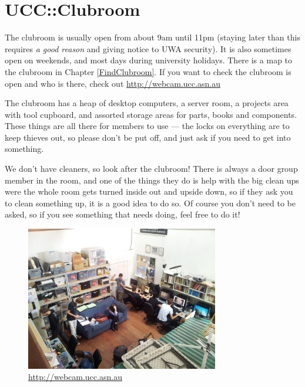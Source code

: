 \chapter{UCC::Clubroom}

\begin{mdframed}
\null
The clubroom is usually open from about 9am until 11pm (staying later than this requires \emph{a good reason} and giving notice to UWA security). It is also sometimes open on weekends, and most days during university holidays. There is a map to the clubroom in Chapter \ref{FindClubroom}. If you want to check the clubroom is open and who is there, check out \url{http://webcam.ucc.asn.au}

The clubroom has a heap of desktop computers, a server room, a projects area with tool cupboard, and assorted storage areas for parts, books and components. These things are all there for members to use --- the locks on everything are to keep thieves out, so please don't be put off, and just ask if you need to get into something.

We don't have cleaners, so look after the clubroom! There is always a door group member in the room, and one of the things they do is help with the big clean ups were the whole room gets turned inside out and upside down, so if they ask you to clean something up, it is a good idea to do so. Of course you don't need to be asked, so if you see something that needs doing, feel free to do it!

\begin{figure}[H]
	\centering
	\includegraphics[width=0.75\textwidth]{figures/2014-04-2712-31-56.jpg}
	\caption{\url{http://webcam.ucc.asn.au}}
	\label{webcam.jpg}
\end{figure}


\end{mdframed}
